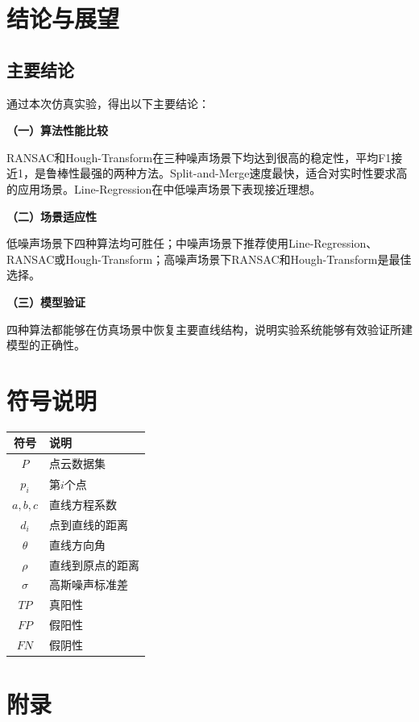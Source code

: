 \documentclass[12pt,a4paper]{article}
\begin{document}
\section{结论与展望}

\subsection{主要结论}

通过本次仿真实验，得出以下主要结论：

\textbf{（一）算法性能比较}

RANSAC和Hough-Transform在三种噪声场景下均达到很高的稳定性，平均F1接近1，是鲁棒性最强的两种方法。Split-and-Merge速度最快，适合对实时性要求高的应用场景。Line-Regression在中低噪声场景下表现接近理想。

\textbf{（二）场景适应性}

低噪声场景下四种算法均可胜任；中噪声场景下推荐使用Line-Regression、RANSAC或Hough-Transform；高噪声场景下RANSAC和Hough-Transform是最佳选择。

\textbf{（三）模型验证}

四种算法都能够在仿真场景中恢复主要直线结构，说明实验系统能够有效验证所建模型的正确性。

\section*{符号说明}

\begin{table}[H]
\centering
\begin{tabular}{cl}
\toprule
符号 & 说明 \\
\midrule
$P$ & 点云数据集 \\
$p_i$ & 第$i$个点 \\
$a, b, c$ & 直线方程系数 \\
$d_i$ & 点到直线的距离 \\
$\theta$ & 直线方向角 \\
$\rho$ & 直线到原点的距离 \\
$\sigma$ & 高斯噪声标准差 \\
$TP$ & 真阳性 \\
$FP$ & 假阳性   \\
$FN$ & 假阴性 \\
\bottomrule
\end{tabular}
\end{table}

\section*{附录}
\end{document}

